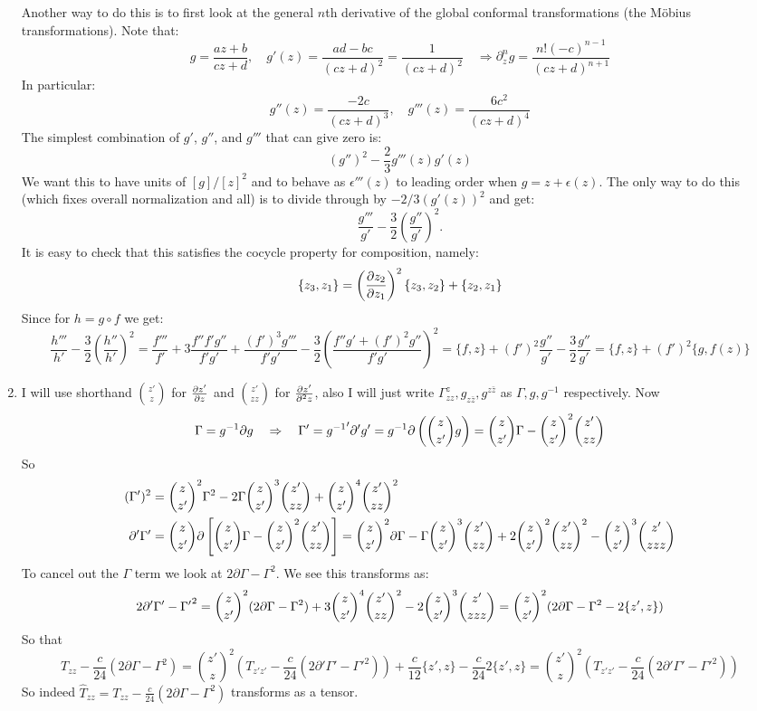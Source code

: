 \documentclass[11pt]{article}
\begin{document}
\begin{enumerate}
	
	Another way to do this is to first look at the general $n$th derivative of the global conformal transformations (the M\"obius transformations). Note that:
	\[
		g = \frac{az+b}{cz+d}, \quad g'(z) = \frac{ad-bc}{(cz+d)^2} = \frac{1}{(cz+d)^2} \quad \Rightarrow \partial^n_z g = \frac{n! (-c)^{n-1}}{(cz+d)^{n+1}}
	\]
	In particular:
	\[
		g''(z) = \frac{-2c}{(cz+d)^3}, \quad g'''(z) = \frac{6c^2}{(cz+d)^4}
	\]
	The simplest combination of $g'$, $g''$, and $g'''$ that can give zero is:
	\[
		(g'')^2 - \frac{2}{3} g'''(z) g'(z)
	\]
	We want this to have units of $[g]/[z]^2$ and to behave as $\epsilon'''(z)$ to leading order when $g = z + \epsilon(z)$. The only way to do this (which fixes overall normalization and all) is to divide through by $-2/3 (g'(z))^2$ and get:
	\[
		\frac{g'''}{g'} - \frac{3}{2} \left(\frac{g''}{g'}\right)^2.
	\]
	It is easy to check that this satisfies the cocycle property for composition, namely:
	\begin{equation}
		\{z_3, z_1 \} = \left( \frac{\partial z_2}{\partial z_1} \right)^2 \{z_3, z_2\} +  \{z_2, z_1 \} 
	\end{equation}
	Since for $h = g \circ f$ we get:
	\[
		\frac{h'''}{h'} - \frac32 \left(\frac{h''}{h'}\right)^2 = \frac{f'''}{f'} + 3 \frac{f'' f' g''}{f' g'} + \frac{(f')^3 g'''}{f' g'} - \frac32 \left(\frac{f'' g' + (f')^2 g''}{f' g'} \right)^2 = \{f, z\} + (f')^2 \frac{g''}{g'} - \frac32 \frac{g''}{g'} = \{f, z\} + (f')^2 \{g, f(z)\}
	\]
	
	\item I will use shorthand ${z' \choose z}$ for $\frac{\partial z'}{\partial z}$ and ${z' \choose z z}$ for $\frac{\partial z'}{\partial^2 z}$, also I will just write $\Gamma_{zz}^z, g_{z\bar z}, g^{z \bar z}$ as $\Gamma, g, g^{-1}$ respectively. Now
	\[
		\Gamma = g^{-1} \partial g \quad \Rightarrow \quad \Gamma' = {g^{-1}}' \partial' g' = g^{-1} \partial\left( {z \choose z'} g \right) = {z \choose z'} \Gamma - {z \choose z'}^2 {z' \choose zz}
	\]
	So 
	\[
	\begin{aligned}
			(\Gamma')^2 &= {z \choose z'}^2 \Gamma^2 - 2 \Gamma {z \choose z'}^3 {z' \choose zz} + {z \choose z'}^4 {z' \choose zz}^2 \\
			\partial' \Gamma'&
			= {z \choose z'} \partial \left[{z \choose z'} \Gamma - {z \choose z'}^2 {z' \choose zz} \right]
			=  {z \choose z'}^2 \partial \Gamma
			- \Gamma {z \choose z'}^3 {z' \choose zz}
			+ 2 {z \choose z'}^2 {z' \choose zz}^2
			- {z \choose z'}^3 {z' \choose zzz}
	\end{aligned}
	\]
	To cancel out the $\Gamma$ term we look at $2 \partial \Gamma - \Gamma^2$. We see this transforms as:
	\[
		2 \partial' \Gamma' - {\Gamma'}^2 = {z \choose z'}^2 (2 \partial \Gamma - \Gamma^2) + 3 {z \choose z'}^4 {z' \choose zz}^2 - 2 {z \choose z'}^3 {z' \choose zzz} = {z \choose z'}^2 (2 \partial \Gamma - \Gamma^2 - 2 \{z' , z\})
	\]
	So that
	\[
		T_{zz} - \frac{c}{24} (2 \partial \Gamma - \Gamma^2) = { z' \choose z}^2 (T_{z' z'} - \frac{c}{24} (2 \partial' \Gamma' - {\Gamma'}^2)) + \frac{c}{12} \{z' , z\} - \frac{c}{24} 2 \{z', z\} 
		= { z' \choose z}^2 (T_{z' z'} - \frac{c}{24} (2 \partial' \Gamma' - {\Gamma'}^2))
	\]	
	So indeed $\hat T_{zz}= T_{zz} - \frac{c}{24} (2 \partial \Gamma - \Gamma^2)$ transforms as a tensor.
	

\end{enumerate}
\end{document}
